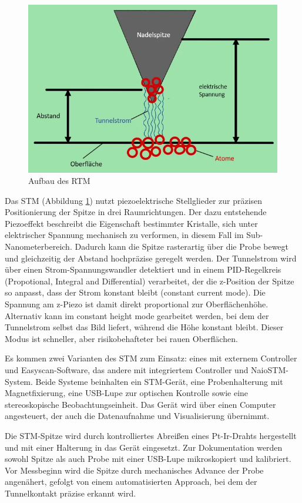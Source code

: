 \begin{figure}[H]
\centering
\includegraphics[width=\linewidth]{figs/RTM}
\caption{Aufbau des RTM \cite{RTM}}
\label{fig:RTM}
\end{figure}
Das STM (Abbildung \ref{fig:RTM}) nutzt piezoelektrische Stellglieder zur präzisen Positionierung der Spitze in drei Raumrichtungen. Der dazu entstehende Piezoeffekt beschreibt die Eigenschaft bestimmter Kristalle, sich unter elektrischer Spannung mechanisch zu verformen, in diesem Fall im Sub-Nanometerbereich. Dadurch kann die Spitze rasterartig über die Probe bewegt und gleichzeitig der Abstand hochpräzise geregelt werden. Der Tunnelstrom wird über einen Strom-Spannungswandler detektiert und in einem PID-Regelkreis (Propotional, Integral and Differential) verarbeitet, der die z-Position der Spitze so anpasst, dass der Strom konstant bleibt (constant current mode). Die Spannung am z-Piezo ist damit direkt proportional zur Oberflächenhöhe. Alternativ kann im constant height mode gearbeitet werden, bei dem der Tunnelstrom selbst das Bild liefert, während die Höhe konstant bleibt. Dieser Modus ist schneller, aber risikobehafteter bei rauen Oberflächen.


Es kommen zwei Varianten des STM zum Einsatz: eines mit externem Controller und Easyscan-Software, das andere mit integriertem Controller und NaioSTM-System. Beide Systeme beinhalten ein STM-Gerät, eine Probenhalterung mit Magnetfixierung, eine USB-Lupe zur optischen Kontrolle sowie eine stereoskopische Beobachtungseinheit. Das Gerät wird über einen Computer angesteuert, der auch die Datenaufnahme und Visualisierung übernimmt.

Die STM-Spitze wird durch kontrolliertes Abreißen eines Pt-Ir-Drahts hergestellt und mit einer Halterung in das Gerät eingesetzt. Zur Dokumentation werden sowohl Spitze als auch Probe mit einer USB-Lupe mikroskopiert und kalibriert. Vor Messbeginn wird die Spitze durch mechanisches Advance der Probe angenähert, gefolgt von einem automatisierten Approach, bei dem der Tunnelkontakt präzise erkannt wird.

